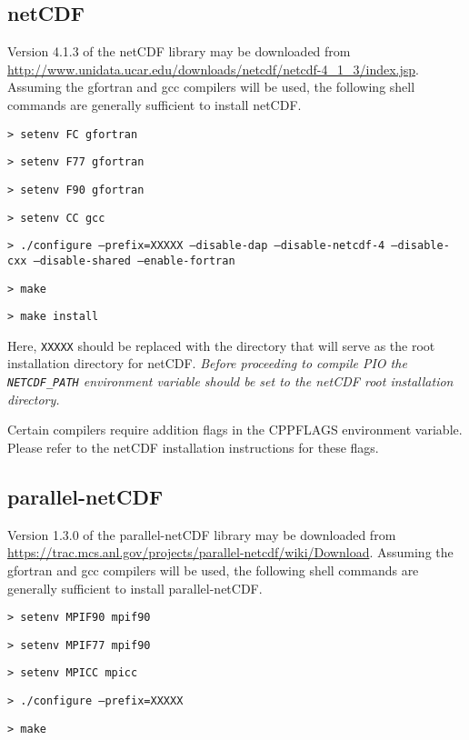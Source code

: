\subsection{netCDF}

Version 4.1.3 of the netCDF library may be downloaded from \url{http://www.unidata.ucar.edu/downloads/netcdf/netcdf-4\_1\_3/index.jsp}.
Assuming the gfortran and gcc compilers will be used, the following shell commands are generally sufficient to install netCDF.

\vspace{12pt}
{\tt > setenv FC gfortran}

{\tt > setenv F77 gfortran} 

{\tt > setenv F90 gfortran}

{\tt > setenv CC gcc} 

{\tt > ./configure --prefix=XXXXX --disable-dap --disable-netcdf-4 --disable-cxx \hfill\break --disable-shared --enable-fortran} 

{\tt > make}

{\tt > make install}
\vspace{12pt}

Here, {\tt XXXXX} should be replaced with the directory that will serve as the root installation directory for netCDF.
{\em Before proceeding to compile PIO the {\tt NETCDF\_PATH} environment variable should be set to the netCDF root installation directory.}

Certain compilers require addition flags in the CPPFLAGS environment variable. Please refer to the netCDF installation instructions for these flags.

\subsection{parallel-netCDF}

Version 1.3.0 of the parallel-netCDF library may be downloaded from \url{https://trac.mcs.anl.gov/projects/parallel-netcdf/wiki/Download}.
Assuming the gfortran and gcc compilers will be used, the following shell commands are generally sufficient to install parallel-netCDF.

\vspace{12pt}
{\tt > setenv MPIF90 mpif90}

{\tt > setenv MPIF77 mpif90} 

{\tt > setenv MPICC mpicc}  

{\tt > ./configure --prefix=XXXXX} 

{\tt > make}

